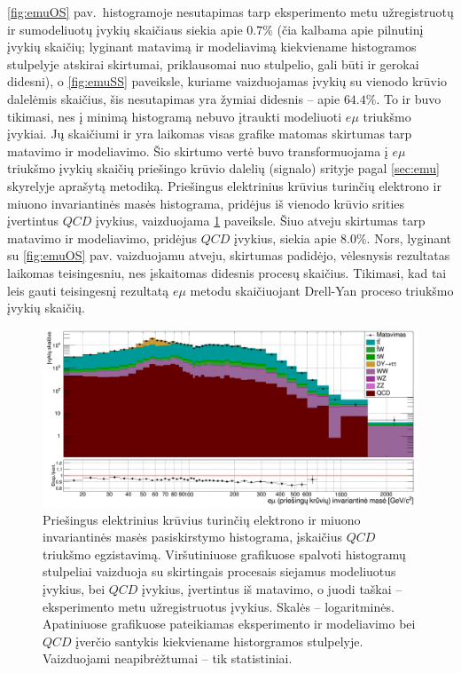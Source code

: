 \documentclass[a4paper, 12pt]{article}
\newcommand{\emu}{e\mu}
\newcommand{\QCD}{QC\! D}
\begin{document}
\ref{fig:emuOS} pav.\ histogramoje nesutapimas tarp eksperimento metu užregistruotų ir sumodeliuotų įvykių skaičiaus siekia
apie $0.7\%$ (čia kalbama apie pilnutinį įvykių skaičių; lyginant matavimą ir modeliavimą kiekviename histogramos stulpelyje
atskirai skirtumai, priklausomai nuo stulpelio, gali būti ir gerokai didesni), o \ref{fig:emuSS} paveiksle, kuriame
vaizduojamas įvykių su vienodo krūvio dalelėmis skaičius, šis nesutapimas yra žymiai didesnis -- apie $64.4\%$.
To ir buvo tikimasi, nes į minimą histogramą nebuvo įtraukti modeliuoti $\emu$ triukšmo įvykiai.
Jų skaičiumi ir yra laikomas visas grafike matomas skirtumas tarp matavimo ir modeliavimo.
Šio skirtumo vertė buvo transformuojama į $\emu$ triukšmo įvykių skaičių priešingo krūvio dalelių (signalo) srityje pagal
\ref{sec:emu} skyrelyje aprašytą metodiką.
Priešingus elektrinius krūvius turinčių elektrono ir miuono invariantinės masės histograma, pridėjus iš vienodo krūvio srities
įvertintus $\QCD$ įvykius, vaizduojama \ref{fig:emuWQCD} paveiksle.
Šiuo atveju skirtumas tarp matavimo ir modeliavimo, pridėjus $\QCD$ įvykius, siekia apie $8.0\%$.
Nors, lyginant su \ref{fig:emuOS} pav. vaizduojamu atveju, skirtumas padidėjo, vėlesnysis rezultatas laikomas teisingesniu,
nes įskaitomas didesnis procesų skaičius.
Tikimasi, kad tai leis gauti teisingesnį rezultatą $\emu$ metodu skaičiuojant Drell-Yan proceso triukšmo įvykių skaičių.

\begin{figure}
	\includegraphics[width=\linewidth]{emuWQCD_BIG.png}
	\caption{\label{fig:emuWQCD} \small
		Priešingus elektrinius krūvius turinčių elektrono ir miuono invariantinės masės pasiskirstymo histograma, įskaičius
		$\QCD$ triukšmo egzistavimą.
		Viršutiniuose grafikuose spalvoti histogramų stulpeliai vaizduoja su skirtingais procesais siejamus modeliuotus įvykius,
		bei $\QCD$ įvykius, įvertintus iš matavimo, o juodi taškai -- eksperimento metu užregistruotus įvykius.
		Skalės -- logaritminės.
		Apatiniuose grafikuose pateikiamas eksperimento ir modeliavimo bei $\QCD$ įverčio santykis kiekviename historgramos stulpelyje.
		Vaizduojami neapibrėžtumai -- tik statistiniai.
	}
\end{figure}
\end{document}
